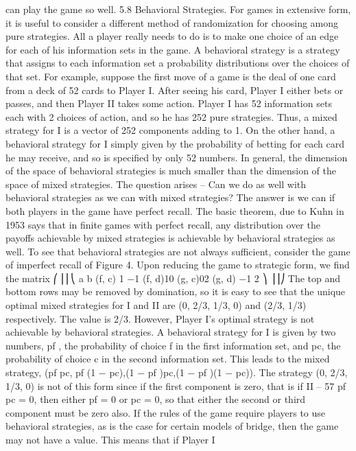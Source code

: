 can play the game so well.
5.8 Behavioral Strategies. For games in extensive form, it is useful to consider a
different method of randomization for choosing among pure strategies. All a player really
needs to do is to make one choice of an edge for each of his information sets in the game.
A behavioral strategy is a strategy that assigns to each information set a probability
distributions over the choices of that set.
For example, suppose the first move of a game is the deal of one card from a deck of
52 cards to Player I. After seeing his card, Player I either bets or passes, and then Player
II takes some action. Player I has 52 information sets each with 2 choices of action, and
so he has 252 pure strategies. Thus, a mixed strategy for I is a vector of 252 components
adding to 1. On the other hand, a behavioral strategy for I simply given by the probability
of betting for each card he may receive, and so is specified by only 52 numbers.
In general, the dimension of the space of behavioral strategies is much smaller than
the dimension of the space of mixed strategies. The question arises – Can we do as well
with behavioral strategies as we can with mixed strategies? The answer is we can if both
players in the game have perfect recall. The basic theorem, due to Kuhn in 1953 says that
in finite games with perfect recall, any distribution over the payoffs achievable by mixed
strategies is achievable by behavioral strategies as well.
To see that behavioral strategies are not always sufficient, consider the game of imperfect
recall of Figure 4. Upon reducing the game to strategic form, we find the matrix
⎛
⎜⎜⎝
a b
(f, c) 1 −1
(f, d)10
(g, c)02
(g, d) −1 2
⎞
⎟⎟⎠
The top and bottom rows may be removed by domination, so it is easy to see that the
unique optimal mixed strategies for I and II are (0, 2/3, 1/3, 0) and (2/3, 1/3) respectively.
The value is 2/3. However, Player I’s optimal strategy is not achievable by behavioral
strategies. A behavioral strategy for I is given by two numbers, pf , the probability of choice
f in the first information set, and pc, the probability of choice c in the second information
set. This leads to the mixed strategy, (pf pc, pf (1 − pc),(1 − pf )pc,(1 − pf )(1 − pc)). The
strategy (0, 2/3, 1/3, 0) is not of this form since if the first component is zero, that is if
II – 57
pf pc = 0, then either pf = 0 or pc = 0, so that either the second or third component must
be zero also.
If the rules of the game require players to use behavioral strategies, as is the case for
certain models of bridge, then the game may not have a value. This means that if Player I
